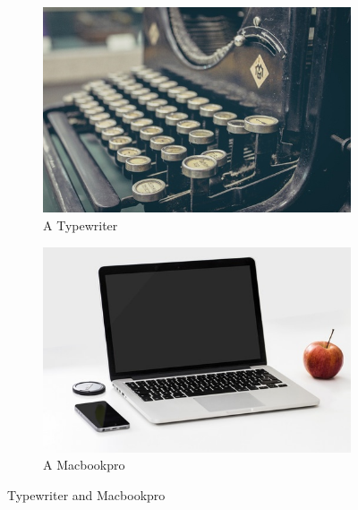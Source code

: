 \documentclass[document.tex]{subfiles}
\begin{document}
\begin{figure}[H]
        \centering
        \begin{subfigure}[b]{0.4\textwidth}
                \includegraphics[width=\textwidth]{imgs/typewriter.jpg}
                \caption{A Typewriter}
                \label{fig:typewriter}
        \end{subfigure}
        \begin{subfigure}[b]{0.4\textwidth}
                \includegraphics[width=\textwidth]{imgs/macbookpro.jpg}
                \caption{A Macbookpro}
                \label{fig:macbookpro}
        \end{subfigure}
        \caption{Typewriter and Macbookpro}\label{fig:typewriter_macbookpro}
\end{figure}
\end{document}
